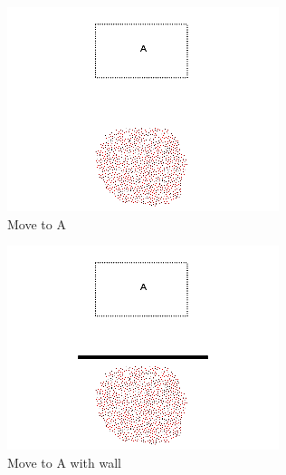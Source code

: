 \documentclass[]{article}
\begin{document}
\begin{figure}
	\centering
	\begin{subfigure}{0.42\textwidth}
		\centering
		\includegraphics[width=\linewidth]{slide_images/Swarm_Robot_Control_-_1000_Robot_0003.png}
		\caption{Move to A}
		\label{fig:sub1}
	\end{subfigure}%
	\begin{subfigure}{0.42\textwidth}
		\centering
		\includegraphics[width=\linewidth]{slide_images/Swarm_Robot_Control_-_1000_Robot_0005.png}
		\caption{Move to A with wall}
		\label{fig:sub2}
	\end{subfigure}
	\begin{subfigure}{0.42\textwidth}
		\centering

\end{subfigure}
\end{figure}
\end{document}
